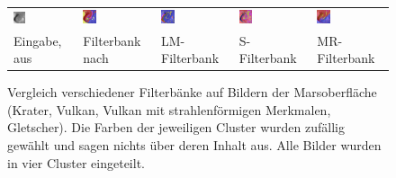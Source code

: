 \begin{figure}[h!]
\begin{tabular}{p{}p{}p{}p{}p{}}
	\includegraphics[width=0.2\textwidth]{images/Gre13_05.jpg} &
	\includegraphics[width=0.2\textwidth]{images/gen/filterbanks/Gre13_05.jpg_TSUGF.png} &
	\includegraphics[width=0.2\textwidth]{images/gen/filterbanks/Gre13_05.jpg_LM.png} &
	\includegraphics[width=0.2\textwidth]{images/gen/filterbanks/Gre13_05.jpg_S.png} &
	\includegraphics[width=0.2\textwidth]{images/gen/filterbanks/Gre13_05.jpg_MR.png} \\
	
	\hspace{1pt}\newline\centering Eingabe, aus \cite{greeley_13} &
	\hspace{1pt}\newline\centering Filterbank nach \cite{jain_91} &
	\hspace{1pt}\newline\centering LM-Filterbank \cite{leung_01} &
	\hspace{1pt}\newline\centering S-Filterbank \cite{schmid_01} &
	\hspace{1pt}\newline\centering MR-Filterbank \cite{visgeo} \\
\end{tabular}
\caption{Vergleich verschiedener Filterbänke auf Bildern der Marsoberfläche (Krater, Vulkan, Vulkan mit strahlenförmigen Merkmalen, Gletscher). Die Farben der jeweiligen Cluster wurden zufällig gewählt und sagen nichts über deren Inhalt aus. Alle Bilder wurden in vier Cluster eingeteilt.}
\label{fig:filterbank_comparision}
\end{figure}

